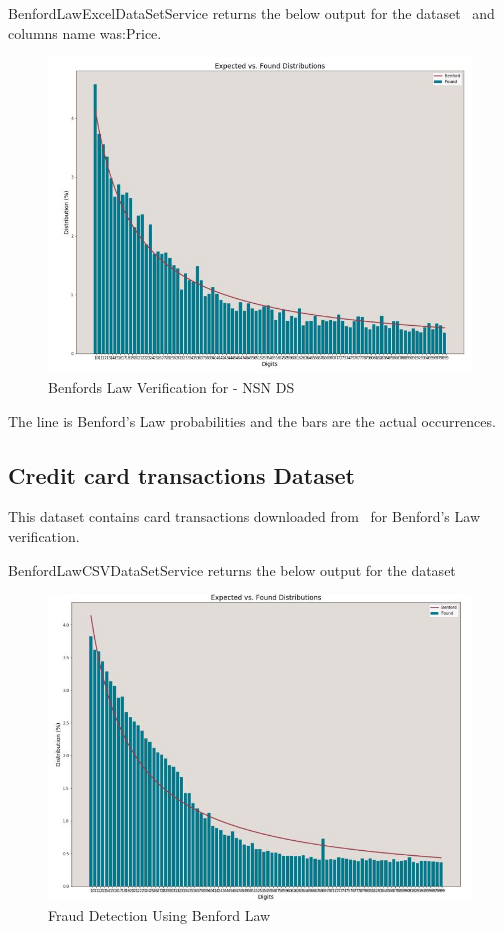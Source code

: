 BenfordLawExcelDataSetService returns the below
output for the dataset~\cite{hid-sp18-514-excelDatalocation}
and columns name was:Price.

\begin{figure}[!ht]
\centering\includegraphics[width=\columnwidth]{images/benford_nsn.JPG}
  \caption{Benfords Law Verification for - NSN DS}\label{f:NSN-ds-benfordlaw}
\end{figure}

The line is Benford’s Law probabilities and the bars are 
the actual occurrences.


\subsection{Credit card transactions Dataset}
This dataset contains card transactions downloaded 
from~\cite{hid-sp18-514-purchase-card-desc}
for Benford's Law verification.

BenfordLawCSVDataSetService returns the below
output for the dataset~\cite{hid-sp18-514-purchase-card-ds}

\begin{figure}[!ht]
\centering\includegraphics[width=\columnwidth]{images/ben_card_trx.JPG}
  \caption{Fraud Detection Using Benford Law}\label{f:card-ds-benfordlaw}
\end{figure}

